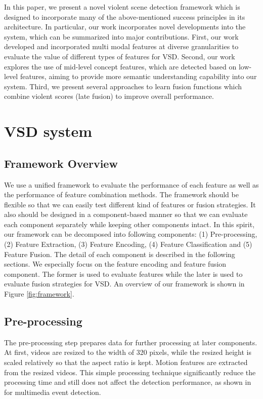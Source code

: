 \documentclass[review]{elsarticle}
\begin{document}
In this paper, we present a novel violent scene detection framework which is designed to incorporate many of the above-mentioned success principles in its architecture. In particular, our work incorporates novel developments into the system, which can be summarized into major contributions. First, our work developed and incorporated multi modal features at diverse granularities to evaluate the value of different types of features for VSD. Second, our work explores the use of mid-level concept features, which are detected based on low-level features, aiming to provide more semantic understanding capability into our system. Third,  we present several approaches to learn fusion functions which combine violent scores (late fusion) to improve overall performance.

\section{VSD system}
\subsection{Framework Overview}
We use a unified framework to evaluate the performance of each feature as well as the performance of feature combination methods. The framework should be flexible so that we can easily test different kind of features or fusion strategies. It also should be designed in a component-based manner so that we can evaluate each component separately while keeping other components intact. In this spirit, our framework can be decomposed into following components: (1) Pre-processing, (2) Feature Extraction, (3) Feature Encoding, (4) Feature Classification and (5) Feature Fusion. The detail of each component is described in the following sections. We especially focus on the feature encoding and feature fusion component. The former is used to evaluate features while the later is used to evaluate fusion strategies for VSD. An overview of our framework is shown in Figure \ref{fig:framework}.

\subsection{Pre-processing}
The pre-processing step prepares data for further processing at later components. At first, videos are resized to the width of 320 pixels, while the resized height is scaled relatively so that the aspect ratio is kept. Motion features are extracted from the resized videos. This simple processing technique significantly reduce the processing time and still does not affect the detection performance, as shown in \cite{aly2013axes} for multimedia event detection.
\end{document}
